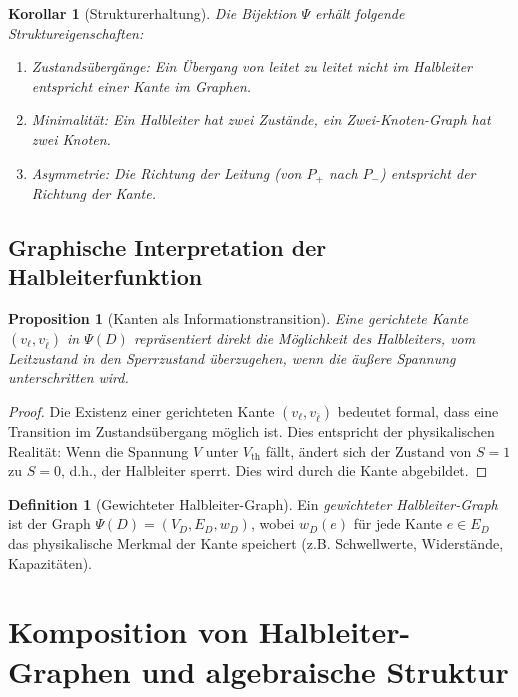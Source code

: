 \documentclass[12pt, a4paper]{article}
\newtheorem{proposition}[theorem]{Proposition}
\newtheorem{corollary}[theorem]{Korollar}
\theoremstyle{definition}
\newtheorem{definition}[theorem]{Definition}
\theoremstyle{remark}
\newcommand{\leit}{\ell}
\newcommand{\sperr}{\bar{\ell}}
\begin{document}
\begin{corollary}[Strukturerhaltung]
Die Bijektion $\Psi$ erhält folgende Struktureigenschaften:
\begin{enumerate}[label=(\alph*)]
  \item Zustandsübergänge: Ein Übergang von leitet zu leitet nicht im Halbleiter entspricht einer Kante im Graphen.
  \item Minimalität: Ein Halbleiter hat zwei Zustände, ein Zwei-Knoten-Graph hat zwei Knoten.
  \item Asymmetrie: Die Richtung der Leitung (von $P_+$ nach $P_-$) entspricht der Richtung der Kante.
\end{enumerate}
\end{corollary}

\subsection{Graphische Interpretation der Halbleiterfunktion}
\label{subsec:graphische_interpretation}

\begin{proposition}[Kanten als Informationstransition]
\label{prop:kanten_transition}
Eine gerichtete Kante $(v_{\leit}, v_{\sperr})$ in $\Psi(D)$ repräsentiert direkt die Möglichkeit des Halbleiters, vom Leitzustand in den Sperrzustand überzugehen, wenn die äußere Spannung unterschritten wird.
\end{proposition}

\begin{proof}
Die Existenz einer gerichteten Kante $(v_{\leit}, v_{\sperr})$ bedeutet formal, dass eine Transition im Zustandsübergang möglich ist. Dies entspricht der physikalischen Realität: Wenn die Spannung $V$ unter $V_{\mathrm{th}}$ fällt, ändert sich der Zustand von $S = 1$ zu $S = 0$, d.h., der Halbleiter sperrt. Dies wird durch die Kante abgebildet.
\end{proof}

\begin{definition}[Gewichteter Halbleiter-Graph]
\label{def:gewichteter_halbleiter_graph}
Ein \emph{gewichteter Halbleiter-Graph} ist der Graph $\Psi(D) = (V_D, E_D, w_D)$, wobei $w_D(e)$ für jede Kante $e \in E_D$ das physikalische Merkmal der Kante speichert (z.B. Schwellwerte, Widerstände, Kapazitäten).
\end{definition}

\section{Komposition von Halbleiter-Graphen und algebraische Struktur}
\label{sec:komposition}
\end{document}

